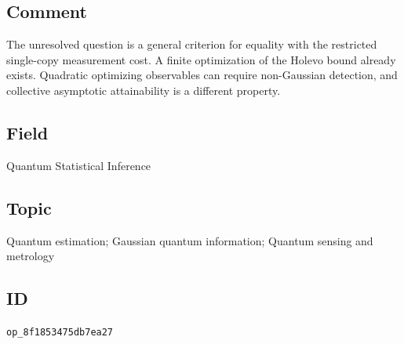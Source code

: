 \subsection*{Comment}

The unresolved question is a general criterion for equality with the restricted single-copy measurement cost. A finite optimization of the Holevo bound already exists. Quadratic optimizing observables can require non-Gaussian detection, and collective asymptotic attainability is a different property.

\subsection*{Field}

Quantum Statistical Inference

\subsection*{Topic}

Quantum estimation; Gaussian quantum information; Quantum sensing and metrology

\subsection*{ID}

\texttt{op\_8f1853475db7ea27}
